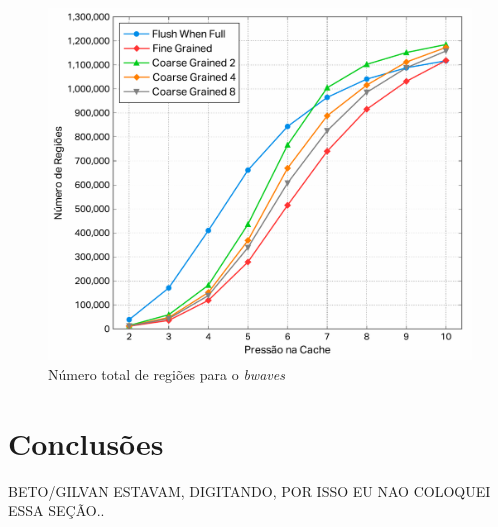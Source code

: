 \documentclass[11pt,twoside]{article}
\begin{document}
\begin{figure}[!ht]
	\centering
\includegraphics[scale=0.4]{./figs/bwaves-tot-reg}
\caption{Número total de regiões para o \emph{bwaves}}
\label{fig:tot-reg-bwaves}
\end{figure}





\newpage

\section{Conclusões}
\begin{large}
BETO/GILVAN ESTAVAM, DIGITANDO, POR ISSO EU NAO COLOQUEI ESSA SEÇÃO..
\end{large}




\end{document}
